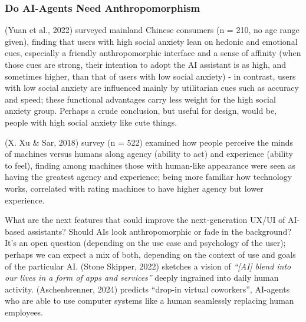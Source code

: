 \documentclass[
  12pt,
  letterpaper,
  DIV=11,
  numbers=noendperiod]{scrartcl}
\begin{document}
\subsubsection{Do AI-Agents Need
Anthropomorphism}\label{do-ai-agents-need-anthropomorphism}

(Yuan et al., 2022) surveyed mainland Chinese consumers (n = 210, no age
range given), finding that users with high social anxiety lean on
hedonic and emotional cues, especially a friendly anthropomorphic
interface and a sense of affinity (when those cues are strong, their
intention to adopt the AI assistant is as high, and sometimes higher,
than that of users with low social anxiety) - in contrast, users with
low social anxiety are influenced mainly by utilitarian cues such as
accuracy and speed; these functional advantages carry less weight for
the high social anxiety group. Perhaps a crude conclusion, but useful
for design, would be, people with high social anxiety like cute things.

(X. Xu \& Sar, 2018) survey (n = 522) examined how people perceive the
minds of machines versus humans along agency (ability to act) and
experience (ability to feel), finding among machines those with
human-like appearance were seen as having the greatest agency and
experience; being more familiar how technology works, correlated with
rating machines to have higher agency but lower experience.

What are the next features that could improve the next-generation UX/UI
of AI-based assistants? Should AIs look anthropomorphic or fade in the
background? It's an open question (depending on the use case and
psychology of the user); perhaps we can expect a mix of both, depending
on the context of use and goals of the particular AI. (Stone Skipper,
2022) sketches a vision of \emph{``{[}AI{]} blend into our lives in a
form of apps and services''} deeply ingrained into daily human activity.
(Aschenbrenner, 2024) predicts ``drop-in virtual coworkers'', AI-agents
who are able to use computer systems like a human seamlessly replacing
human employees.

\def\pandoctableshortcapt{Anthropomorphic AIs for Human Emotions}
\end{document}
